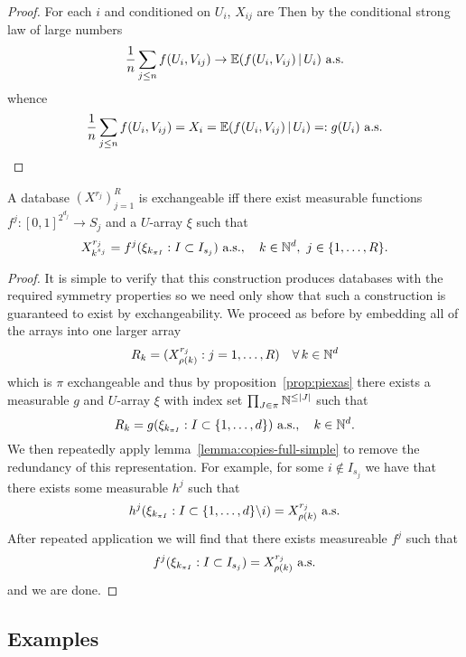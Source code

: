 \begin{proof}
  For each $i$ and conditioned on $U_i$, ${X}_{ij}$ are \iid
  Then by the conditional strong law of large numbers
  \[
    \frac{1}{n}\sum_{j \leq n} f(U_i, V_{ij}) \to \mathbb{E}(f(U_i, V_{ij})\,|\, U_i) \,\, \textrm{a.s.}
  \]
  whence
  \[
    \frac{1}{n}\sum_{j \leq n} f(U_i, V_{ij}) = X_i = \mathbb{E}(f(U_i, V_{ij})\,|\, U_i) =: g(U_i) \,\, \textrm{a.s.}
  \]
\end{proof}

\begin{thm}
  \label{thm:as-database}
  A database $(X^{r_j})_{j=1}^R$ is exchangeable iff there exist measurable functions $f^j : [0,1]^{2^{d_j}} \to S_j$ and a $U$-array $\xi$ such that
  \begin{equation}
    X_{k^{s_j}}^{r_j} = f^j(\xi_{k_{\pi I}} : I \subset I_{s_j}) \ \textrm{a.s.}, \quad k \in \mathbb{N}^d, \ j \in \{1,\ldots,R\}.
  \end{equation}
\end{thm}

\begin{proof}
  It is simple to verify that this construction produces databases with the required symmetry properties so we need only show that such a construction is guaranteed to exist by exchangeability.
  We proceed as before by embedding all of the arrays into one larger array
  \[
    R_{k} = (X^{r_j}_{\rho(k)} : j = 1,\dots,R) \quad \forall \, k \in \mathbb{N}^d
  \]
  which is $\pi$ exchangeable and thus by proposition~\ref{prop:piexas} there exists a measurable $g$ and $U$-array $\xi$ with index set $\prod_{J\in\pi} \mathbb{N}^{\leq |J|}$ such that
  \[
    R_{k} = g(\xi_{k_{\pi I}} : I \subset \{1,\ldots,d\}) \ \textrm{a.s.}, \quad k \in \mathbb{N}^d.
  \]
  We then repeatedly apply lemma~\ref{lemma:copies-full-simple} to remove the redundancy of this representation.
  For example, for some $i \notin I_{s_j}$ we have that there exists some measurable $h^j$ such that
  \[
    h^j(\xi_{k_{\pi I}} : I \subset \{1,\ldots,d\} \backslash i) = X^{r_j}_{\rho(k)} \ \textrm{a.s.}
  \]
  After repeated application we will find that there exists measureable $f^j$ such that
  \[
    f^j(\xi_{k_{\pi I}} : I \subset I_{s_j}) = X^{r_j}_{\rho(k)} \ \textrm{a.s.}
  \]
  and we are done.
\end{proof}

\subsection{Examples}

